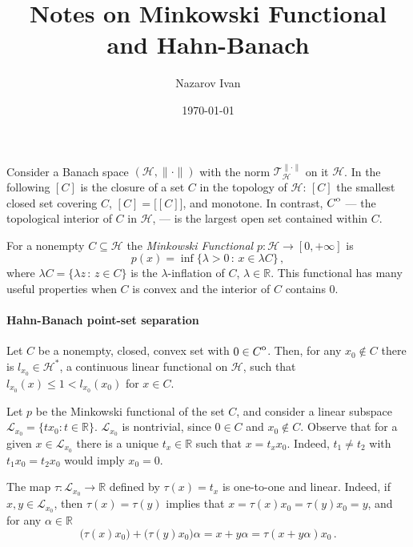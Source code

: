 \documentclass[a4paper]{article}
\title{Notes on Minkowski Functional and Hahn-Banach}
\author{Nazarov Ivan}
\date{\today}
\newcommand{\Hcal}{\mathcal{H}}
\newcommand{\real}{\mathbb{R}}
\newcommand{\interior}[1]{%
  {\kern0pt#1}^{\mathrm{o}}%
}
\newcommand{\Tcal}{\mathcal{T}}
\newcommand{\Lcal}{\mathcal{L}}
\begin{document}
\maketitle

Consider a Banach space $(\Hcal, \|\cdot\|)$ with the norm $\Tcal^{\|\cdot\|}_\Hcal$
on it $\Hcal$. In the following $[C]$ is the closure of a set $C$ in the topology
of $\Hcal$: $[C]$ the smallest closed set covering $C$, $[C] = \bigl[[C]\bigr]$,
and monotone. In contrast, $\interior{C}$ --- the topological interior of $C$ in
$\Hcal$, --- is the largest open set contained within $C$.

For a nonempty $C \subseteq \Hcal$ the {\it Minkowski Functional} $p\colon \Hcal
\to [0, +\infty]$ is
\begin{equation*}
  p(x)
    = \inf \bigl\{ \lambda > 0\,:\, x \in \lambda C\bigr\}
    \,,
\end{equation*}
where $\lambda C = \{\lambda z \,:\, z\in C\}$ is the $\lambda$-inflation of $C$,
$\lambda \in\real$. This functional has many useful properties when $C$ is convex
and the interior of $C$ contains $0$.

\paragraph{Hahn-Banach point-set separation} %
\label{par:hahn_banach_point_set_separation}

Let $C$ be a nonempty, closed, convex set with $0\in \interior{C}$. Then, for any
$x_0\notin C$ there is $l_{x_0} \in \Hcal^*$, a continuous linear functional on
$\Hcal$, such that $l_{x_0}(x) \leq 1 < l_{x_0}(x_0)$ for $x\in C$.

Let $p$ be the Minkowski functional of the set $C$, and consider a linear subspace
$\Lcal_{x_0} = \{t x_0\colon t\in \real\}$. $\Lcal_{x_0}$ is nontrivial, since $0\in C$
and $x_0\notin C$. Observe that for a given $x\in \Lcal_{x_0}$ there is a unique
$t_x \in \real$ such that $x = t_x x_0$. Indeed, $t_1\neq t_2$ with $t_1 x_0 = t_2 x_0$
would imply $x_0 = 0$.

The map $\tau\colon \Lcal_{x_0} \to \real$ defined by $\tau(x) = t_x$ is one-to-one
and linear. Indeed, if $x, y\in \Lcal_{x_0}$, then $\tau(x) = \tau(y)$ implies that
$x = \tau(x) x_0 = \tau(y) x_0 = y$, and for any $\alpha\in \real$
\begin{equation}
  \bigl( \tau(x) x_0 \bigr) + \bigl( \tau(y) x_0 \bigr) \alpha
    = x + y \alpha
    = \tau(x + y \alpha) x_0
  \,.
\end{equation}
\end{document}

